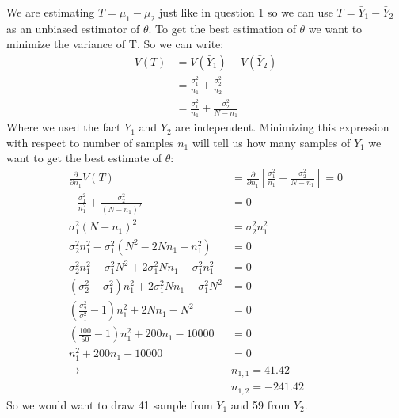 \documentclass{article}
\newcommand{\1}{\mathbf{1}}
\begin{document}
We are estimating $T=\mu_1 - \mu_2$ just like in question 1 so we can use $T=\bar Y_1 - \bar Y_2$ as an unbiased estimator of $\theta$. To get the best estimation of $\theta$ we want to minimize the variance of T. So we can write:
\begin{align*}
    V(T) &= V(\bar Y_1) + V(\bar Y_2) \\
    &= \frac{\sigma^2_1}{n_1} + \frac{\sigma^2_2}{n_2} \\
    &= \frac{\sigma^2_1}{n_1} + \frac{\sigma^2_2}{N - n_1}
\end{align*}
Where we used the fact $Y_1$ and $Y_2$ are independent. Minimizing this expression with respect to number of samples $n_1$ will tell us how many samples of $Y_1$ we want to get the best estimate of $\theta$: 
\begin{align*}
    \frac{\partial}{\partial n_1} V(T) &=  \frac{\partial}{\partial n_1} \left[ \frac{\sigma^2_1}{n_1} + \frac{\sigma^2_2}{N - n_1} \right] = 0 \\
    -\frac{\sigma^2_1}{n_1^2} + \frac{\sigma^2_2}{(N - n_1)^2} &= 0\\
    \sigma^2_1 (N-n_1)^2 &= \sigma^2_2 n_1^2 \\
    \sigma^2_2 n_1^2 - \sigma^2_1 (N^2 -2Nn_1 + n_1^2) &= 0\\
    \sigma^2_2 n_1^2 - \sigma^2_1 N^2 + 2\sigma^2_1 Nn_1 - \sigma^2_1 n_1^2 &= 0\\
    (\sigma^2_2 - \sigma^2_1) n_1^2 + 2\sigma^2_1 Nn_1 - \sigma^2_1 N^2  &=0 \\
    \left(\frac{\sigma^2_2}{\sigma^2_1} - 1\right) n_1^2 + 2Nn_1 - N^2  &=0 \\
    \left(\frac{100}{50} - 1\right) n_1^2 + 200n_1 - 10000  &=0 \\
    n_1^2 + 200n_1 - 10000  &=0 \\
    \rightarrow &n_{1,1} = 41.42\\
    &n_{1,2} = -241.42
\end{align*}
So we would want to draw 41 sample from $Y_1$ and 59 from $Y_2$. 


\newpage
\end{document}

